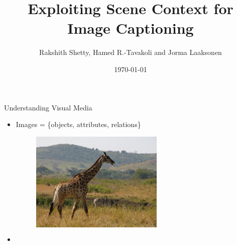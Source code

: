 \documentclass{beamer}
\begin{document}

\title{Exploiting Scene Context for Image Captioning}
\author[Rakshith Shetty and Jorma Laaksonen]{Rakshith Shetty, Hamed R.\@-Tavakoli and Jorma Laaksonen}
\date{\today}

\frame{\titlepage} 



\begin{frame}{Understanding Visual Media}
  \begin{itemize}
  \item<1-> Images = \{objects, attributes, relations\}\\
  \begin{figure}[h]
    \begin{columns}
    \hfill\includegraphics[width=0.6\textwidth]{images/COCO_train2014_000000544856.jpg}
    \hspace{-5mm}
    \centering
    \caption{}
    \end{columns}
  \end{figure}
  \item<2-> 
  \end{itemize}
\end{frame}
\end{document}
